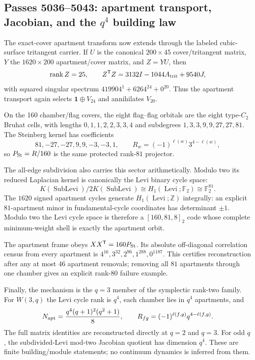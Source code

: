 \subsection*{Passes 5036--5043: apartment transport, Jacobian, and the $q^4$ building law}
The exact-cover apartment transform now extends through the labeled cubic-surface tritangent carrier.  If $U$ is the canonical $200\times45$ cover/tritangent matrix, $Y$ the $1620\times200$ apartment/cover matrix, and $Z=YU$, then
\[
\operatorname{rank}Z=25,\qquad Z^{\mathsf T}Z=3132I-1044A_{\rm trit}+9540J,
\]
with squared singular spectrum $419904^1+6264^{24}+0^{20}$.  Thus the apartment transport again selects $\mathbf1\oplus V_{24}$ and annihilates $V_{20}$.

On the 160 chamber/flag covers, the eight flag--flag orbitals are the eight type-$C_2$ Bruhat cells, with lengths $0,1,1,2,2,3,3,4$ and subdegrees $1,3,3,9,9,27,27,81$.  The Steinberg kernel has coefficients
\[
81,-27,-27,9,9,-3,-3,1,
\qquad R_w=(-1)^{\ell(w)}3^{4-\ell(w)},
\]
so $P_{\rm St}=R/160$ is the same protected rank-$81$ projector.

The all-edge subdivision also carries this sector arithmetically.  Modulo two its reduced Laplacian kernel is canonically the Levi binary cycle space:
\[
K(\operatorname{SubLevi})/2K(\operatorname{SubLevi})\cong H_1(\operatorname{Levi};\mathbb F_2)\cong\mathbb F_2^{81}.
\]
The $1620$ signed apartment cycles generate $H_1(\operatorname{Levi};\mathbb Z)$ integrally: an explicit $81$-apartment minor in fundamental-cycle coordinates has determinant $\pm1$.  Modulo two the Levi cycle space is therefore a $[160,81,8]_2$ code whose complete minimum-weight shell is exactly the apartment orbit.

The apartment frame obeys $XX^{\mathsf T}=160P_{\rm St}$.  Its absolute off-diagonal correlation census from every apartment is $4^{16},3^{32},2^{96},1^{288},0^{1187}$.  This certifies reconstruction after any at most $46$ apartment removals; removing all $81$ apartments through one chamber gives an explicit rank-$80$ failure example.

Finally, the mechanism is the $q=3$ member of the symplectic rank-two family.  For $W(3,q)$ the Levi cycle rank is $q^4$, each chamber lies in $q^4$ apartments, and
\[
N_{\rm apt}=\frac{q^4(q+1)^2(q^2+1)}8,
\qquad R_{fg}=(-1)^{\ell(f,g)}q^{4-\ell(f,g)}.
\]
The full matrix identities are reconstructed directly at $q=2$ and $q=3$.  For odd $q$, the subdivided-Levi mod-two Jacobian quotient has dimension $q^4$.  These are finite building/module statements; no continuum dynamics is inferred from them.
